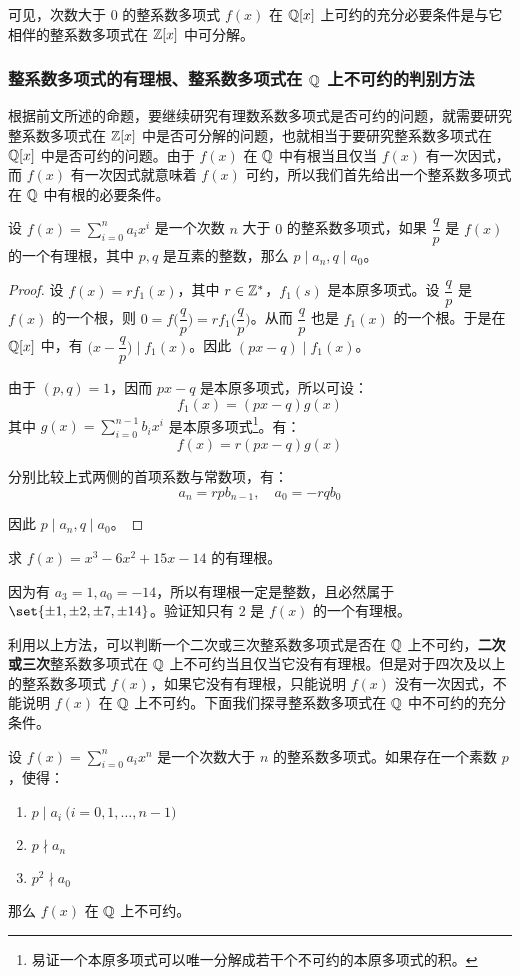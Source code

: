 可见，次数大于 $0$ 的整系数多项式 $f(x)$ 在 $\mathbb Q[x]$ 上可约的充分必要条件是与它相伴的整系数多项式在 $\mathbb Z[x]$ 中可分解。

\subsubsection{整系数多项式的有理根、整系数多项式在 $\mathbb Q$ 上不可约的判别方法}

根据前文所述的命题，要继续研究有理数系数多项式是否可约的问题，就需要研究整系数多项式在 $\mathbb Z[x]$ 中是否可分解的问题，也就相当于要研究整系数多项式在 $\mathbb Q[x]$ 中是否可约的问题。由于 $f(x)$ 在 $\mathbb Q$ 中有根当且仅当 $f(x)$ 有一次因式，而 $f(x)$ 有一次因式就意味着 $f(x)$ 可约，所以我们首先给出一个整系数多项式在 $\mathbb Q$ 中有根的必要条件。

\begin{proposition}
	设 $f(x) = \sum\limits_{i = 0}^n a_i x^i$ 是一个次数 $n$ 大于 $0$ 的整系数多项式，如果 $\dfrac{q}{p}$ 是 $f(x)$ 的一个有理根，其中 $p, q$ 是互素的整数，那么 $p \mid a_n, q \mid a_0$。
\end{proposition}

\begin{proof}
	设 $f(x) = r f_1(x)$，其中 $r \in \mathbb Z^*$，$f_1(s)$ 是本原多项式。设 $\dfrac{q}{p}$ 是 $f(x)$ 的一个根，则 $0 = f \biggl( \dfrac{q}{p} \biggr) = r f_1 \biggl( \dfrac{q}{p} \biggr)$。从而 $\dfrac{q}{p}$ 也是 $f_1(x)$ 的一个根。于是在 $\mathbb Q[x]$ 中，有 $\biggl( x - \dfrac{q}{p} \biggr) \mid f_1(x)$。因此 $(px - q) \mid f_1(x)$。

	由于 $(p, q) = 1$，因而 $px - q$ 是本原多项式，所以可设：
	$$
	f_1(x) = (px - q) g(x)
	$$
	其中 $g(x) = \sum\limits_{i = 0}^{n - 1} b_i x^i$ 是本原多项式\footnote{易证一个本原多项式可以唯一分解成若干个不可约的本原多项式的积。}。有：
	$$
	f(x) = r (px - q) g(x)
	$$

	分别比较上式两侧的首项系数与常数项，有：
	$$
	a_n = r p b_{n - 1}, \quad a_0 = - r q b_0
	$$

	因此 $p \mid a_n, q \mid a_0$。
\end{proof}

\begin{example}
	求 $f(x) = x^3 - 6 x^2 + 15 x - 14$ 的有理根。

	因为有 $a_3 = 1, a_0 = -14$，所以有理根一定是整数，且必然属于 $\set{\pm 1, \pm 2, \pm 7, \pm 14}$。验证知只有 $2$ 是 $f(x)$ 的一个有理根。
\end{example}

利用以上方法，可以判断一个二次或三次整系数多项式是否在 $\mathbb Q$ 上不可约，\textbf{二次或三次}整系数多项式在 $\mathbb Q$ 上不可约当且仅当它没有有理根。但是对于四次及以上的整系数多项式 $f(x)$，如果它没有有理根，只能说明 $f(x)$ 没有一次因式，不能说明 $f(x)$ 在 $\mathbb Q$ 上不可约。下面我们探寻整系数多项式在 $\mathbb Q$ 中不可约的充分条件。

\begin{theorem}
	设 $f(x) = \sum\limits_{i = 0}^n a_i x^n$ 是一个次数大于 $n$ 的整系数多项式。如果存在一个素数 $p$，使得：
	\begin{enumerate}
		\item $p \mid a_i \pod{i = 0, 1, \ldots, n - 1}$
		\item $p \nmid a_n$
		\item $p^2 \nmid a_0$
	\end{enumerate}

	那么 $f(x)$ 在 $\mathbb Q$ 上不可约。
\end{theorem}

